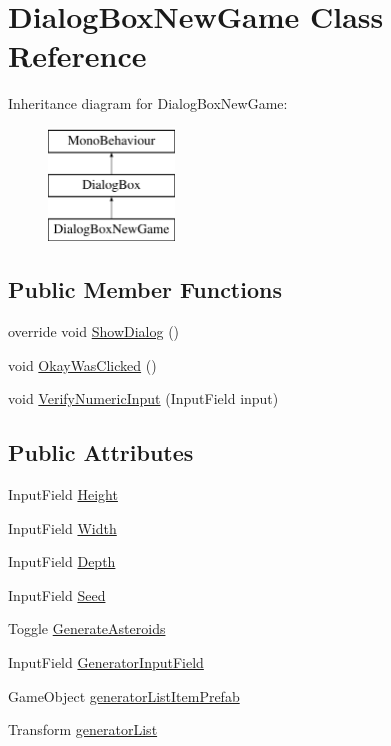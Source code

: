 \hypertarget{class_dialog_box_new_game}{}\section{Dialog\+Box\+New\+Game Class Reference}
\label{class_dialog_box_new_game}
Inheritance diagram for Dialog\+Box\+New\+Game\+:\begin{figure}[H]
\begin{center}
\leavevmode
\includegraphics[height=3.000000cm]{class_dialog_box_new_game}
\end{center}
\end{figure}
\subsection*{Public Member Functions}
\begin{DoxyCompactItemize}
\item 
override void \hyperlink{class_dialog_box_new_game_a80ad43c7b72fad35a600511e95578eea}{Show\+Dialog} ()
\item 
void \hyperlink{class_dialog_box_new_game_a75aa94cf4f95e81cd48073130e920748}{Okay\+Was\+Clicked} ()
\item 
void \hyperlink{class_dialog_box_new_game_aba8966a8a4189ca053113e6076272519}{Verify\+Numeric\+Input} (Input\+Field input)
\end{DoxyCompactItemize}
\subsection*{Public Attributes}
\begin{DoxyCompactItemize}
\item 
Input\+Field \hyperlink{class_dialog_box_new_game_a5f8de46895369c12ee755cc7c446a58f}{Height}
\item 
Input\+Field \hyperlink{class_dialog_box_new_game_a8015fa26620431471b2dcdbf5c0ea7f3}{Width}
\item 
Input\+Field \hyperlink{class_dialog_box_new_game_acf425662878824539f86bafd516af793}{Depth}
\item 
Input\+Field \hyperlink{class_dialog_box_new_game_a19f690bbb7eed35de41c759173515d48}{Seed}
\item 
Toggle \hyperlink{class_dialog_box_new_game_a2258f936bcc36abe1ab99d1e661cc750}{Generate\+Asteroids}
\item 
Input\+Field \hyperlink{class_dialog_box_new_game_a640b168dee48a122f6009bd540d93974}{Generator\+Input\+Field}
\item 
Game\+Object \hyperlink{class_dialog_box_new_game_abee01eb103d1fe15af4c85af31960afc}{generator\+List\+Item\+Prefab}
\item 
Transform \hyperlink{class_dialog_box_new_game_a624e261798f7411bce938a2d76f4aa9e}{generator\+List}
\end{DoxyCompactItemize}
